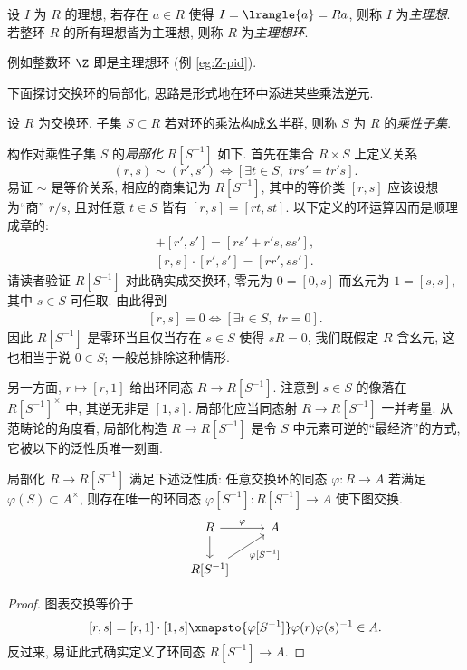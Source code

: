 \begin{definition}\label{def:PID}
	设 $I$ 为 $R$ 的理想, 若存在 $a \in R$ 使得 $I = \lrangle{a} = Ra$, 则称 $I$ 为\emph{主理想}. 若整环 $R$ 的所有理想皆为主理想, 则称 $R$ 为\emph{主理想环}.
\end{definition}
例如整数环 $\Z$ 即是主理想环 (例 \ref{eg:Z-pid}).

下面探讨交换环的局部化, 思路是形式地在环中添进某些乘法逆元.
\begin{definition}
	设 $R$ 为交换环. 子集 $S \subset R$ 若对环的乘法构成幺半群, 则称 $S$ 为 $R$ 的\emph{乘性子集}. 
\end{definition}

构作对乘性子集 $S$ 的\emph{局部化} $R[S^{-1}]$ 如下. 首先在集合 $R \times S$ 上定义关系 
\[ (r,s) \sim (r',s') \iff \left[ \exists t \in S, \; trs' = tr's \right]. \]
易证 $\sim$ 是等价关系, 相应的商集记为 $R[S^{-1}]$, 其中的等价类 $[r,s]$ 应该设想为``商'' $r/s$, 且对任意 $t \in S$ 皆有 $[r,s]=[rt,st]$. 以下定义的环运算因而是顺理成章的:
\begin{gather*}
	[r,s] + [r',s'] = [rs' + r's, ss'], \\
	[r,s] \cdot [r',s'] = [rr', ss'].
\end{gather*}
请读者验证 $R[S^{-1}]$ 对此确实成交换环, 零元为 $0 = [0, s]$ 而幺元为 $1 = [s,s]$, 其中 $s \in S$ 可任取. 由此得到
\begin{gather}\label{eqn:localization-zero}
	[r,s]=0 \iff \left[ \exists t \in S, \; tr=0 \right].
\end{gather}
因此 $R[S^{-1}]$ 是零环当且仅当存在 $s \in S$ 使得 $sR=0$, 我们既假定 $R$ 含幺元, 这也相当于说 $0 \in S$; 一般总排除这种情形. 

另一方面, $r \mapsto [r,1]$ 给出环同态 $R \to R[S^{-1}]$. 注意到 $s \in S$ 的像落在 $R[S^{-1}]^\times$ 中, 其逆无非是 $[1,s]$. 局部化应当同态射 $R \to R[S^{-1}]$ 一并考量. 从范畴论的角度看, 局部化构造 $R \to R[S^{-1}]$ 是令 $S$ 中元素可逆的``最经济''的方式, 它被以下的泛性质唯一刻画.

\begin{proposition}
	局部化 $R \to R[S^{-1}]$ 满足下述泛性质: 任意交换环的同态 $\varphi: R \to A$ 若满足 $\varphi(S) \subset A^\times$, 则存在唯一的环同态 $\varphi[S^{-1}]: R[S^{-1}] \to A$ 使下图交换.
	\[ \begin{tikzcd}
		R \arrow[r, "\varphi"] \arrow[d] & A \\
		R[S^{-1}] \arrow[ru, "{\varphi[S^{-1}]}"'] &
	\end{tikzcd} \]
\end{proposition}
\begin{proof}
	图表交换等价于
	\[ [r,s] =[r,1] \cdot [1,s] \xmapsto{\varphi[S^{-1}]} \varphi(r) \varphi(s)^{-1} \in A. \]
	反过来, 易证此式确实定义了环同态 $R[S^{-1}] \to A$.
\end{proof}

